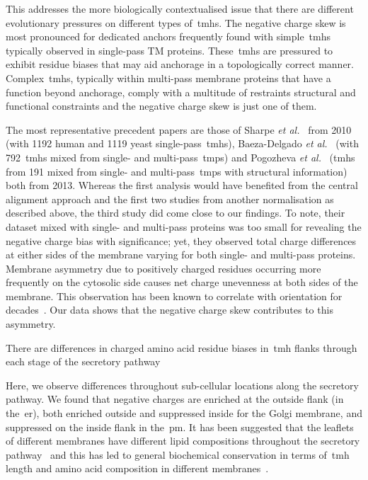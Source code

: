 \begin{enumerate}[i]
 This addresses the more biologically contextualised issue that there are different evolutionary pressures on different types of~\gls{tmh}s.
The negative charge skew is most pronounced for dedicated anchors frequently found with simple~\gls{tmh}s typically observed in single-pass TM proteins.
These~\gls{tmh}s are pressured to exhibit residue biases that may aid anchorage in a topologically correct manner.
Complex~\gls{tmh}s, typically within multi-pass membrane proteins that have a function beyond anchorage, comply with a multitude of restraints structural and functional constraints and the negative charge skew is just one of them.
\end{enumerate}

The most representative precedent papers are those of Sharpe \textit{et al.}~\cite{Sharpe2010} from 2010 (with 1192 human and 1119 yeast single-pass~\gls{tmh}s), Baeza-Delgado \textit{et al.}~\cite{Baeza-Delgado2013} (with 792~\gls{tmh}s mixed from single- and multi-pass~\gls{tmp}s) and Pogozheva \textit{et al.}~\cite{Pogozheva2013} (\gls{tmh}s from 191 mixed from single- and multi-pass~\gls{tmp}s with structural information) both from 2013.
Whereas the first analysis would have benefited from the central alignment approach and the first two studies from another normalisation as described above, the third study did come close to our findings.
To note, their dataset mixed with single- and multi-pass proteins was too small for revealing the negative charge bias with significance; yet, they observed total charge differences at either sides of the membrane varying for both single- and multi-pass proteins.
Membrane asymmetry due to positively charged residues occurring more frequently on the cytosolic side causes net charge unevenness at both sides of the membrane.
This observation has been known to correlate with orientation for decades~\cite{VonHeijne1989, Baeza-Delgado2013, Meindl-Beinker2006}.
Our data shows that the negative charge skew contributes to this asymmetry.

There are differences in charged amino acid residue biases in~\gls{tmh} flanks through each stage of the secretory pathway

Here, we observe differences throughout sub-cellular locations along the secretory pathway.
We found that negative charges are enriched at the outside flank (in the~\gls{er}), both enriched outside and suppressed inside for the Golgi membrane, and suppressed on the inside flank in the~\gls{pm}.
It has been suggested that the leaflets of different membranes have different lipid compositions throughout the secretory pathway~\cite{VanMeer2008} and this has led to general biochemical conservation in terms of~\gls{tmh} length and amino acid composition in different membranes~\cite{Sharpe2010, Pogozheva2013}.

